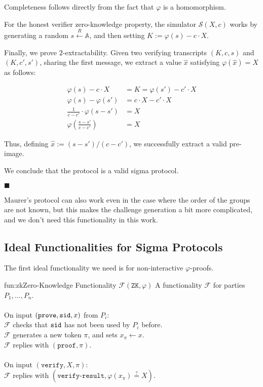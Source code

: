 Completeness follows directly from the fact that $\varphi$ is a homomorphism.

For the honest verifier zero-knowledge property, the simulator $\mathcal{S}(X, c)$ works by generating
a random $s \xleftarrow{R} \mathbb{A}$, and then setting $K := \varphi(s) - c \cdot X$.

Finally, we prove $2$-extractability. Given two verifying transcripts
$(K, c, s)$ and $(K, c', s')$, sharing the first message, we extract
a value $\hat{x}$ satisfying $\varphi(\hat{x}) = X$ as follows:

$$
\begin{aligned}
\varphi(s) - c \cdot X &= K = \varphi(s') - c' \cdot X\\
\varphi(s) - \varphi(s') &= c \cdot X - c' \cdot X\\
\frac{1}{c - c'} \cdot \varphi(s - s') &= X\\
\varphi \left(\frac{s - s'}{c - c'}\right) &= X
\end{aligned}
$$

Thus, defining $\hat{x} := (s - s') / (c - c')$, we successfully extract
a valid pre-image.

We conclude that the protocol is a valid sigma protocol.

$\blacksquare$

Maurer's protocol can also work even in the case where the order of
the groups are not known, but this makes the challenge generation
a bit more complicated, and we don't need this functionality in
this work.

\subsection{Ideal Functionalities for Sigma Protocols}

The first ideal functionality we need is 
for non-interactive $\varphi$-proofs.

\begin{afunctionality}{fun:zk}{Zero-Knowledge Functionality $\mathcal{F}(\texttt{ZK}, \varphi)$}
A functionality $\mathcal{F}$ for parties $P_1, \ldots, P_n$.\\
\\
On input $(\texttt{prove}, \texttt{sid}, x)$ from $P_i$:\\
$\mathcal{F}$ checks that $\texttt{sid}$ has not been used by $P_i$ before.\\
$\mathcal{F}$ generates a new token $\pi$, and sets $x_\pi \gets x$.\\
$\mathcal{F}$ replies with $(\texttt{proof}, \pi)$.\\
\\
On input $(\texttt{verify}, X, \pi)$:\\
$\mathcal{F}$ replies with $(\texttt{verify-result}, \varphi(x_\pi) \stackrel{?}{=} X)$.\\
\end{afunctionality}

